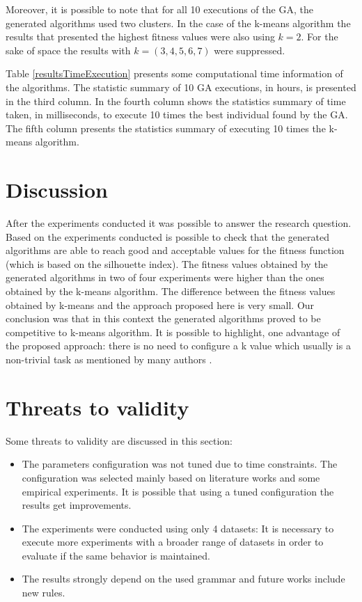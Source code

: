 \documentclass[journal]{IEEEtran}
\begin{document}
	Moreover, it is possible to note that for all 10 executions of the GA, the generated algorithms used two clusters. In the case of the k-means algorithm the results that presented the highest fitness values were also using $k=2$. For the sake of space the results with $k = (3,4,5,6,7)$ were suppressed.
	
	Table \ref{resultsTimeExecution} presents some computational time information of the algorithms. The statistic summary of 10 GA executions, in hours, is presented in the third column. In the fourth column shows the statistics summary of time taken, in milliseconds, to execute 10 times the best individual found by the GA. The fifth column presents the statistics summary of executing 10 times the k-means algorithm.
	
	
	
	\section{Discussion}
	\label{sec:discussion}
	
	After the experiments conducted it was possible to answer the research question. Based on the experiments conducted is possible to check that the generated algorithms are able to reach good and acceptable values for the  fitness function (which is based on the silhouette index). The fitness values obtained by the generated algorithms in two of four experiments were higher than the ones obtained by the k-means algorithm. The difference between the fitness values obtained by k-means and the approach proposed here is very small. Our conclusion was that in this context the generated algorithms proved to be competitive to k-means algorithm. It is possible to highlight, one advantage of the proposed approach: there is no need to configure a k value which usually is a non-trivial task as mentioned by many authors \cite{pham2005selection, yan2005methods, tibshirani2001estimating}.
	
	\section{Threats to validity} \label{sec:threats}
	
	Some threats to validity are discussed in this section:
	\begin{itemize}
		\item The parameters configuration was not tuned due to time constraints. The configuration was selected mainly based on literature works and some empirical experiments. It is possible that using a tuned configuration the results get improvements.
		\item The experiments were conducted using only 4 datasets: It is necessary to execute more experiments with a broader range of datasets in order to evaluate if the same behavior is maintained.
		\item The results strongly depend on the used grammar and future works include new rules.
	\end{itemize}
	
\end{document}
